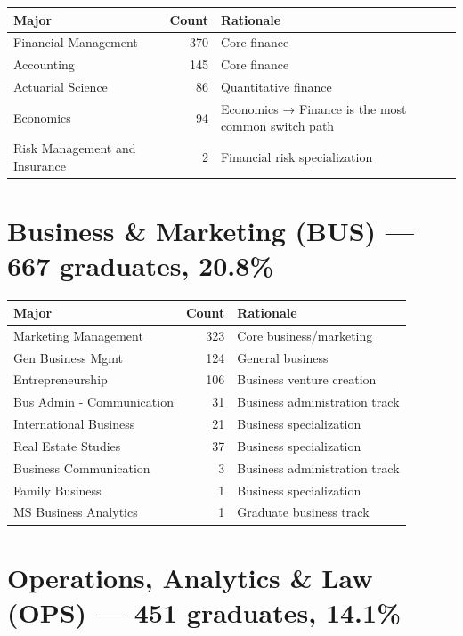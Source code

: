 \documentclass[
  11pt,
  letterpaper,
]{report}
\begin{document}
\begin{longtable}[]{@{}lrl@{}}
\toprule\noalign{}
Major & Count & Rationale \\
\midrule\noalign{}
\endhead
\bottomrule\noalign{}
\endlastfoot
Financial Management & 370 & Core finance \\
Accounting & 145 & Core finance \\
Actuarial Science & 86 & Quantitative finance \\
Economics & 94 & Economics → Finance is the most common switch path \\
Risk Management and Insurance & 2 & Financial risk specialization \\
\end{longtable}

\section{Business \& Marketing (BUS) --- 667 graduates,
20.8\%}\label{business-marketing-bus-667-graduates-20.8}

\begin{longtable}[]{@{}lrl@{}}
\toprule\noalign{}
Major & Count & Rationale \\
\midrule\noalign{}
\endhead
\bottomrule\noalign{}
\endlastfoot
Marketing Management & 323 & Core business/marketing \\
Gen Business Mgmt & 124 & General business \\
Entrepreneurship & 106 & Business venture creation \\
Bus Admin - Communication & 31 & Business administration track \\
International Business & 21 & Business specialization \\
Real Estate Studies & 37 & Business specialization \\
Business Communication & 3 & Business administration track \\
Family Business & 1 & Business specialization \\
MS Business Analytics & 1 & Graduate business track \\
\end{longtable}

\section{Operations, Analytics \& Law (OPS) --- 451 graduates,
14.1\%}\label{operations-analytics-law-ops-451-graduates-14.1}
\end{document}
